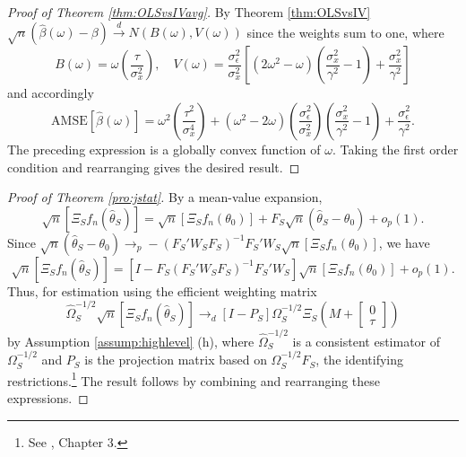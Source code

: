 \begin{proof}[Proof of Theorem \ref{thm:OLSvsIVavg}]
By Theorem \ref{thm:OLSvsIV}
$\sqrt{n}\left(\widehat{\beta}(\omega) - \beta \right)  \overset{d}{\rightarrow}  N\left(B(\omega), V(\omega)\right)$ 
since the weights sum to one, where
\begin{equation*}
	B(\omega) = \omega \left( \frac{\tau}{\sigma_x^2} \right), \quad 
	 V(\omega) =  \frac{\sigma_\epsilon^2}{\sigma_x^2} \left[(2\omega^2 - \omega)\left( \frac{\sigma_x^2}{\gamma^2} - 1\right)+\frac{\sigma_x^2}{\gamma^2} \right]
\end{equation*}
and accordingly
	$$\mbox{AMSE}\left[\widehat{\beta}(\omega) \right] =  \omega^2 \left(\frac{\tau^2}{\sigma_x^4} \right) + (\omega^2 - 2 \omega)\left(\frac{\sigma_\epsilon^2}{\sigma_x^2}\right)\left( \frac{\sigma_x^2}{\gamma^2} - 1\right) + \frac{\sigma_\epsilon^2}{\gamma^2}.$$
The preceding expression is a globally convex function of $\omega$. 
Taking the first order condition and rearranging gives the desired result.
\end{proof}


\begin{proof}[Proof of Theorem \ref{pro:jstat}]
By a mean-value expansion,
	$$\sqrt{n}\left[\Xi_S f_n\left(\widehat{\theta}_S\right)\right]  = \sqrt{n}\left[\Xi_S f_n(\theta_0)\right] + F_S  \sqrt{n}\left(\widehat{\theta}_S - \theta_0\right) + o_p(1).$$
Since $\sqrt{n}\left(\widehat{\theta}_S - \theta_0\right) \rightarrow_p -\left(F_S' W_S F_S  \right)^{-1}F_S'W_S\sqrt{n}\left[\Xi_S f_n(\theta_0)\right]$, we have
	$$\sqrt{n}\left[\Xi_S f_n(\widehat{\theta}_S)\right] = \left[I - F_S\left(F_S' W_S F_S  \right)^{-1}F_S'W_S\right] \sqrt{n}\left[\Xi_S f_n(\theta_0)\right] + o_p(1).$$
Thus, for estimation using the efficient weighting matrix 
$$\widehat{\Omega}^{-1/2}_S \sqrt{n}\left[\Xi_S f_n\left(\widehat{\theta}_S\right)\right] \rightarrow_d\left[I - P_S\right] \Omega_S^{-1/2}\Xi_S\left(M + \left[\begin{array}{c}0\\ \tau \end{array} \right] \right)$$
by Assumption \ref{assump:highlevel} (h), where $\widehat{\Omega}^{-1/2}_S$ is a consistent estimator of $\Omega_S^{-1/2}$ and $P_S$ is the projection matrix based on $\Omega^{-1/2}_S F_S$, the identifying restrictions.\footnote{See \cite{Hallbook}, Chapter 3.} The result follows by combining and rearranging these expressions.
\end{proof}



